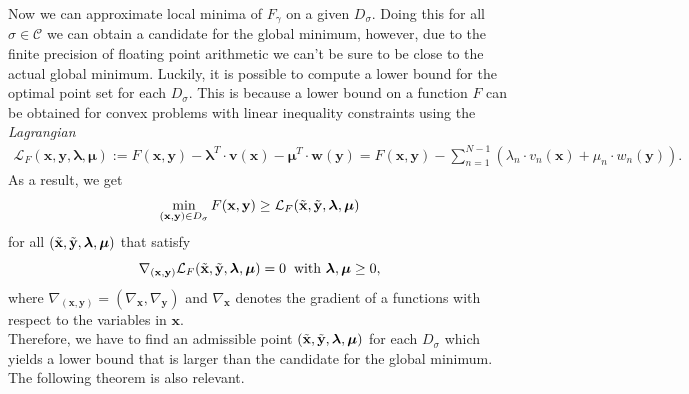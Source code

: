 Now we can approximate local minima of $F_{\gamma}$ on a given $D_{\sigma}$. Doing this for all $\sigma \in \mathcal{C}$ we can obtain a candidate for the global minimum, however, due to the finite precision of floating point arithmetic we can't be sure to be close to the actual global minimum. Luckily, it is possible to compute a lower bound for the optimal point set for each $D_{\sigma}$. This is because a lower bound on a function $F$ can be obtained for convex problems with linear inequality constraints using the \textit{Lagrangian}
\begin{multline*}
    \mathcal{L}_F(\textbf{x},\textbf{y},\bm{\lambda},\bm{\mu}) := F(\textbf{x},\textbf{y}) - \bm{\lambda}^T \cdot \textbf{v}(\textbf{x}) - \bm{\mu}^T \cdot \textbf{w}(\textbf{y}) = F(\textbf{x},\textbf{y}) - \sum_{n=1}^{N-1} (\lambda_n \cdot v_n(\textbf{x}) + \mu_n \cdot w_n(\textbf{y})).
\end{multline*}
As a result, we get
\begin{equation*}
    \min_{(\textbf{x},\textbf{y})\in D_{\sigma}}{F(\textbf{x},\textbf{y})} \geq \mathcal{L}_F(\Tilde{\textbf{x}},\Tilde{\textbf{y}},\bm{\lambda},\bm{\mu})
\end{equation*}
for all $(\Tilde{\textbf{x}},\Tilde{\textbf{y}},\bm{\lambda},\bm{\mu})$ that satisfy
\begin{equation*}
    \nabla_{(\textbf{x},\textbf{y})}\mathcal{L}_F (\Tilde{\textbf{x}},\Tilde{\textbf{y}},\bm{\lambda},\bm{\mu}) = 0 \hspace{2mm} \text{with } \bm{\lambda},\bm{\mu}\geq 0,
\end{equation*}
where $\nabla_{(\textbf{x},\textbf{y})} = (\nabla_{\textbf{x}},\nabla_{\textbf{y}})$ and $\nabla_{\textbf{x}}$ denotes the gradient of a functions with respect to the variables in $\textbf{x}$.\\

Therefore, we have to find an admissible point $(\Tilde{\textbf{x}},\Tilde{\textbf{y}},\bm{\lambda},\bm{\mu})$ for each $D_{\sigma}$ which yields a lower bound that is larger than the candidate for the global minimum. The following theorem is also relevant.\\

